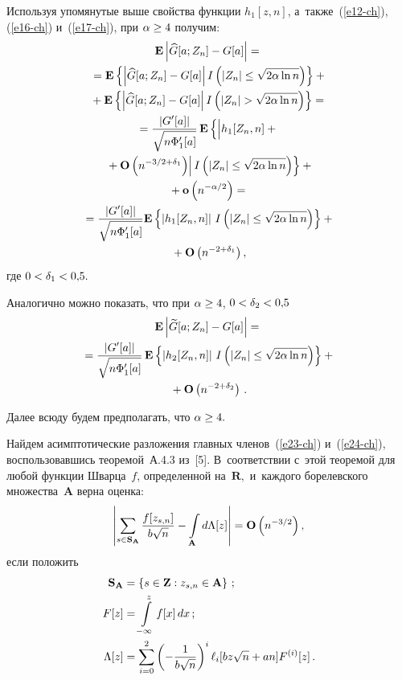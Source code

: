 \begin{multicols}{2}
 Используя упомянутые выше свойства функции  $h_1[z,n]$, а~также~(\ref{e12-ch}), 
 (\ref{e16-ch}) и~(\ref{e17-ch}), при $\alpha\hm\ge 4$ получим:
 \begin{multline}
 \mathbf{E}\left|\widehat{G}[a;Z_n]-G[a]\right|={}\\
 {}=
 \mathbf{E}\left\{\left|\widehat{G}[a;Z_n]-G[a]\right|
 I\left( \left| Z_n\right| \le \sqrt {2\alpha \ln n} \right)\right\}+{}
\\
{}+ \mathbf{E}\left\{\left|\widehat{G}[a;Z_n]-G[a]\right|
 I\left( \left| Z_n\right| > \sqrt {2\alpha \ln n} \right)\right\}={}
 \\
{} =\fr{|G'[a]|}{\sqrt {n\Phi'_1[a]}}\,
 \mathbf{E}\left\{
 \left|
 \vphantom{\mathbf{O}\left(n^{-3/2+\delta_1}\right)}
 h_1[Z_n,n]+{}\right.\right.\\
\left.\left. {}+\mathbf{O}\left(n^{-3/2+\delta_1}\right)\right|
 I\left( \left| Z_n \right| \le \sqrt {2\alpha \ln n} \right) \right\}+{}\\
 {}+
 \mathbf{o}\left(n^{-\alpha/2}\right)={}
\\
 {}=\fr{|G'[a]|}{\sqrt {n\Phi'_1[a]}}
 \mathbf{E}\left\{\left|h_1[Z_n,n]\right|\,
 I\left( |Z_n|\le \sqrt {2\alpha \ln n}\right) \right\}+{}\\
 {}+
 \mathbf{O}\left(n^{-2+\delta_1}\right),
  \label{e23-ch}
 \end{multline}
 где $0<\delta_1\hm<0{,}5.$

 Аналогично можно показать, что при $\alpha\hm\ge 4$, $0\hm<\delta_2\hm<0{,}5$
 \begin{multline}
 \mathbf{E}\left|\widetilde{G}[a;Z_n]-G[a]\right|={}
\\
{}=\displaystyle\frac{\displaystyle |G'[a]|\mathstrut}{\displaystyle \sqrt {n\Phi'_1[a]}\mathstrut}\,
 \mathbf{E}\left\{\left|h_2[Z_n,n]\right|\,I\left( |Z_n|\le 
 \sqrt {2\alpha \ln n}\right) \right\}+{}\\
 {}+\mathbf{O}\left(n^{-2+\delta_2}\right)\,.
 \label{e24-ch}
 \end{multline}

 Далее всюду будем предполагать, что $\alpha\hm\ge 4.$

 Найдем асимптотические разложения главных членов~(\ref{e23-ch}) и~(\ref{e24-ch}),
 воспользовавшись теоремой~А.4.3 из~[5].
 В~соответствии с~этой теоремой
 для любой функции Шварца~$f$, определенной на~$\mathbf{R},$ и~каждого
 борелевского мно\-же\-ст\-ва~$\mathbf{A}$ верна оценка:
 \begin{equation}
 \left|
 \sum\limits_{s\in {\bf S}_\mathbf{A}}  \displaystyle\frac{\displaystyle f[z_{s,n}]\mathstrut}{\displaystyle b\sqrt{n}\mathstrut}
 -\int\limits_{\mathbf{A}} d\Lambda[z] \right| =\mathbf{O}\left(n^{-3/2}\right),
 \label{e25-ch}
 \end{equation}
 если положить
 \begin{align*}
 \mathbf{S}_\mathbf{A}&=\left\{s\in {\bf Z}: z_{s,n}\in \mathbf{A}\right\}\,;\\
 F[z]&=\int\limits_{-\infty}^z f[x]\, dx\,;
 \\
 \Lambda[z]&=\sum\limits_{i=0}^2 \left(-\displaystyle\frac{\displaystyle 1\mathstrut}{\displaystyle b\sqrt{n}\mathstrut}\right)^i
 \ell_i[bz\sqrt{n}+an]F^{(i)}[z]\,.
 \end{align*}


\end{multicols}
